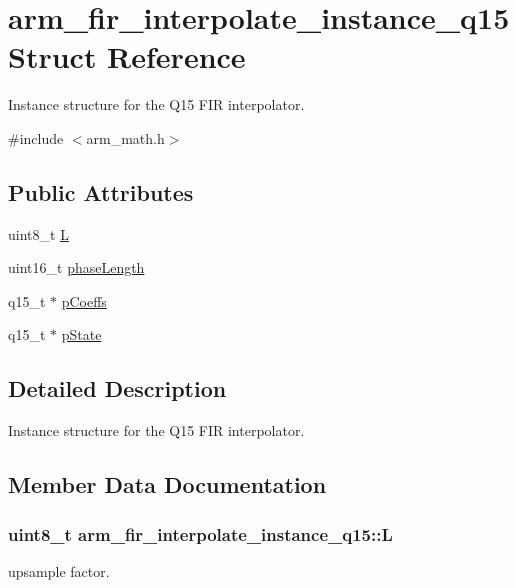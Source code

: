 \hypertarget{structarm__fir__interpolate__instance__q15}{}\section{arm\+\_\+fir\+\_\+interpolate\+\_\+instance\+\_\+q15 Struct Reference}
\label{structarm__fir__interpolate__instance__q15}


Instance structure for the Q15 F\+IR interpolator.  




{\ttfamily \#include $<$arm\+\_\+math.\+h$>$}

\subsection*{Public Attributes}
\begin{DoxyCompactItemize}
\item 
uint8\+\_\+t \hyperlink{structarm__fir__interpolate__instance__q15_a5431bdc079e72a973b51d359f7f13603}{L}
\item 
uint16\+\_\+t \hyperlink{structarm__fir__interpolate__instance__q15_ad5178a02a697a77e0d0e60705d9f0a19}{phase\+Length}
\item 
q15\+\_\+t $\ast$ \hyperlink{structarm__fir__interpolate__instance__q15_a767d91d61d4c0beeddd4325d28d28e24}{p\+Coeffs}
\item 
q15\+\_\+t $\ast$ \hyperlink{structarm__fir__interpolate__instance__q15_a26b864363fa47954248f2590e3a82a3c}{p\+State}
\end{DoxyCompactItemize}


\subsection{Detailed Description}
Instance structure for the Q15 F\+IR interpolator. 

\subsection{Member Data Documentation}
\subsubsection[{\texorpdfstring{L}{L}}]{\setlength{\rightskip}{0pt plus 5cm}uint8\+\_\+t arm\+\_\+fir\+\_\+interpolate\+\_\+instance\+\_\+q15\+::L}\hypertarget{structarm__fir__interpolate__instance__q15_a5431bdc079e72a973b51d359f7f13603}{}\label{structarm__fir__interpolate__instance__q15_a5431bdc079e72a973b51d359f7f13603}
upsample factor. 

